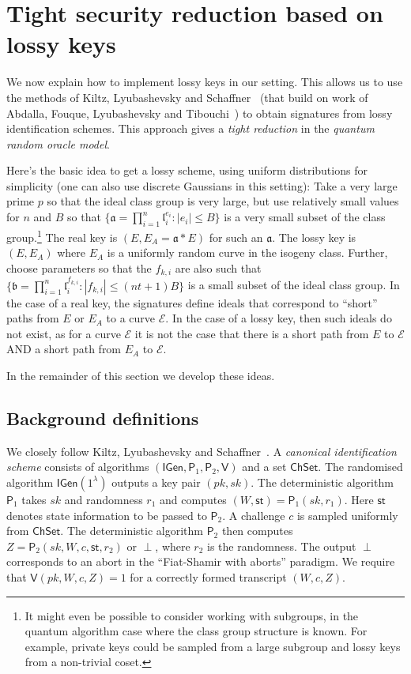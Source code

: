 \documentclass{llncs}
\newcommand{\E}{\mathcal{E}}
\renewcommand{\a}{\mathfrak{a}}
\renewcommand{\b}{\mathfrak{b}}
\renewcommand{\l}{\mathfrak{l}}
\newcommand{\IGen}{\mathsf{IGen}}
\newcommand{\PP}{\mathsf{P}}
\newcommand{\VV}{\mathsf{V}}
\newcommand{\ChSet}{\textsf{ChSet}}
\newcommand{\St}{\textsf{st}}
\begin{document}
\section{Tight security reduction based on lossy keys}\label{sec:lossy-keys}


We now explain how to implement lossy keys in our setting.
This allows us to use the methods of Kiltz, Lyubashevsky and Schaffner~\cite{KLS18} (that build on work of Abdalla, Fouque, Lyubashevsky and Tibouchi~\cite{AFLT12}) to obtain signatures from lossy identification schemes. This approach gives a \emph{tight reduction} in the \emph{quantum random oracle model}.


Here's the basic idea to get a lossy scheme, using uniform distributions for simplicity (one can also use discrete Gaussians in this setting):
Take a very large prime $p$ so that the ideal class group is very large, but use relatively small values for $n$ and $B$ so that $\{ \a = \prod_{i=1}^n \l_i^{e_i} : |e_i| \le B \}$ is a very small subset of the class group.\footnote{It might even be possible to consider working with subgroups, in the quantum algorithm case where the class group structure is known. For example, private keys could be sampled from a large subgroup and lossy keys from a non-trivial coset.}
The real key is $(E, E_A = \a*E )$ for such an $\a$.
The lossy key is $(E, E_A )$ where $E_A$ is a uniformly random curve in the isogeny class.
Further, choose parameters so that the $f_{k,i}$ are also such that $\{ \b = \prod_{i=1}^n \l_i^{f_{k,i}} : |f_{k,i}| \le (nt+1)B \}$ is a small subset of the ideal class group.
In the case of a real key, the signatures define ideals that correspond to ``short'' paths from $E$ or $E_A$ to a  curve $\E$.
In the case of a lossy key, then such ideals do not exist, as for a curve $\E$ it is not the case that there is a short path from $E$ to $\E$ AND a short path from $E_A$ to $\E$.

In the remainder of this section we develop these ideas.


\subsection{Background definitions} \label{sec:KLS-defns}

We closely follow Kiltz, Lyubashevsky and Schaffner~\cite{KLS18}.
A \emph{canonical identification scheme} consists of algorithms $(\IGen, \PP_1, \PP_2, \VV)$ and a set $\ChSet$. The randomised algorithm $\IGen( 1^\lambda )$ outputs a key pair $(pk,sk)$.
The deterministic algorithm $\PP_1$ takes $sk$ and randomness $r_1$ and computes $(W, \St) = \PP_1( sk, r_1 )$. 
Here $\St$ denotes state information to be passed to $\PP_2$.
A challenge $c$ is sampled uniformly from $\ChSet$. The deterministic algorithm $\PP_2$ then computes $Z = \PP_2( sk, W, c, \St, r_2 )$ or $\perp$, where $r_2$ is the randomness.
The output $\perp$ corresponds to an abort in the ``Fiat-Shamir with aborts'' paradigm.
We require that $\VV( pk, W, c, Z ) = 1$ for a correctly formed transcript $(W,c,Z)$.
\end{document}
